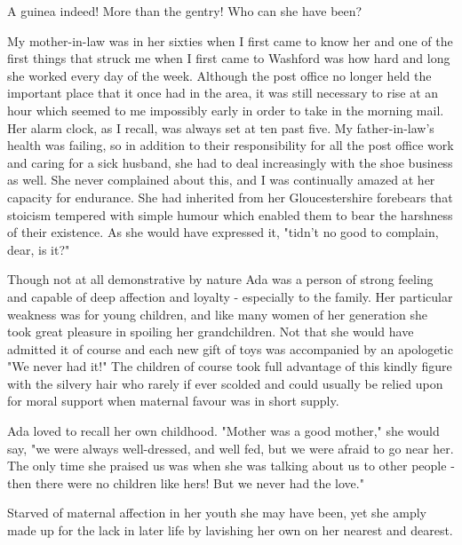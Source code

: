 A guinea indeed! More than the gentry! Who can she have been?

My mother-in-law was in her sixties when I first came to know her and one of the first things that struck me when I first came to Washford was how hard and long she worked every day of the week. Although the post office no longer held the important place that it once had in the area, it was still necessary to rise at an hour which seemed to me impossibly early in order to take in the morning mail. Her alarm clock, as I recall, was always set at ten past five. My father-in-law's health was failing, so in addition to their responsibility for all the post office work and caring for a sick husband, she had to deal increasingly with the shoe business as well. She never complained about this, and I was continually amazed at her capacity for endurance. She had inherited from her Gloucestershire forebears that stoicism tempered with simple humour which enabled them to bear the harshness of their existence. As she would have expressed it, "tidn’t no good to complain, dear, is it?"

Though not at all demonstrative by nature Ada was a person of strong feeling and capable of deep affection and loyalty - especially to the family. Her particular weakness was for young children, and like many women of her generation she took great pleasure in spoiling her grandchildren. Not that she would have admitted it of course and each new gift of toys was accompanied by an apologetic "We never had it!" The children of course took full advantage of this kindly figure with the silvery hair who rarely if ever scolded and could usually be relied upon for moral support when maternal favour was in short supply.

Ada loved to recall her own childhood. "Mother was a good mother," she would say, "we were always well-dressed, and well fed, but we were afraid to go near her. The only time she praised us was when she was talking about us to other people - then there were no children like hers! But we never had the love."

Starved of maternal affection in her youth she may have been, yet she amply made up for the lack in later life by lavishing her own on her nearest and dearest.

